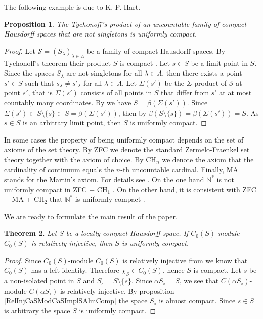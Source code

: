 \documentclass[12pt]{article}
\newtheorem{theorem}{Theorem}[section]
\newtheorem{proposition}[theorem]{Proposition}
\begin{document}
The following example is due to K. P. Hart.

\begin{proposition}\label{UcountProdCompSpIsUnifComp} The Tychonoff's product of an uncountable family of compact Hausdorff spaces that are not singletons is uniformly compact.
\end{proposition}
\begin{proof} Let $\mathcal{S}=(S_\lambda)_{\lambda\in\Lambda}$ be a family of compact Hausdorff spaces. By Tychonoff's theorem their product $S$ is compact \cite[theorem 3.2.4]{EngkingGenTop}. Let $s\in S$ be a limit point in $S$. Since the spaces $S_\lambda$ are not singletons for all $\lambda\in\Lambda$, then there exists a point $s'\in S$ such that $s_\lambda\neq s'_\lambda$ for all $\lambda\in\Lambda$. Let $\Sigma(s')$ be the $\Sigma$-product of $\mathcal{S}$ at point $s'$, that is $\Sigma(s')$ consists of all points in $S$ that differ from $s'$ at at most countably many coordinates. By \cite[theorem 3.12.24(c)]{EngkingGenTop} we have $S=\beta(\Sigma(s'))$. Since $\Sigma(s')\subset S\setminus\{s\}\subset S=\beta(\Sigma(s'))$, then by \cite[corollary 3.6.9]{EngkingGenTop} $\beta(S\setminus\{s\})=\beta(\Sigma(s'))=S$. As $s\in S$ is an arbitrary limit point, then $S$ is uniformly compact.
\end{proof}

In some cases the property of being uniformly compact depends on the set of axioms of the set theory. By \textsc{ZFC} we denote the standard Zermelo-Fraenkel set theory together with the axiom of choice. By \textsc{CH}$_n$ we denote the axiom that the cardinality of continuum equals the $n$-th uncountable cardinal. Finally, \textsc{MA} stands for the Martin's axiom. For details see \cite{KunSetThIndepPrf}. On the one hand $\mathbb{N}^*$ is not uniformly compact in \textsc{ZFC + CH$_1$} \cite{FinGillExtContFuncbN}. On the other hand, it is consistent with \textsc{ZFC + MA + CH$_2$} that $\mathbb{N}^*$ is uniformly compact \cite{DouKunMillCStarEmbdDenPropSbspStoneRemN}.

We are ready to formulate the main result of the paper.

\begin{theorem}\label{RelInjCSModCSImplUnifCompS} Let $S$ be a locally compact Hausdorff space. If $C_0(S)$-module $C_0(S)$ is relatively injective, then $S$ is uniformly compact.
\end{theorem}
\begin{proof} Since $C_0(S)$-module $C_0(S)$ is relatively injective from \cite[corollary 2.2.8 (i)]{RamsHomPropSemgroupAlg} we know that $C_0(S)$ has a left identity. Therefore $\chi_S\in C_0(S)$, hence $S$ is compact. Let $s$ be a non-isolated point in $S$ and $S_\circ=S\setminus\{s\}$. Since $\alpha S_\circ=S$, we see that $C(\alpha S_\circ)$-module $C(\alpha S_\circ)$ is relatively injective. By proposition \ref{RelInjCaSModCaSImplSAlmComp} the space $S_\circ$ is almost compact. Since $s\in S$ is arbitrary the space $S$ is uniformly compact.
\end{proof}
\end{document}
